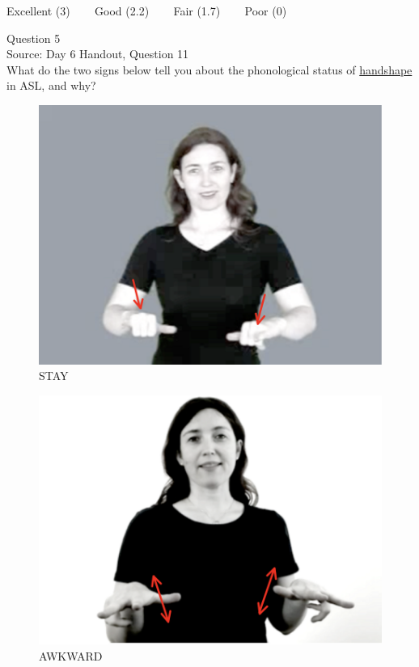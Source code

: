 \documentclass[12pt]{article}
\begin{document}
\vfill
Excellent (3) ~~~ Good (2.2) ~~~ Fair (1.7) ~~~ Poor (0)
\newpage

{\large Question 5}\\

Source: Day 6 Handout, Question 11\\

What do the two signs below tell you about the phonological status of \underline{handshape} in ASL, and why?\\

\begin{figure}[H]
\includegraphics{../images/asl_stay.png}
\caption{STAY}
\end{figure}
\begin{figure}[H]
\includegraphics{../images/asl_awkward.png}
\caption{AWKWARD}
\end{figure}
\end{document}
